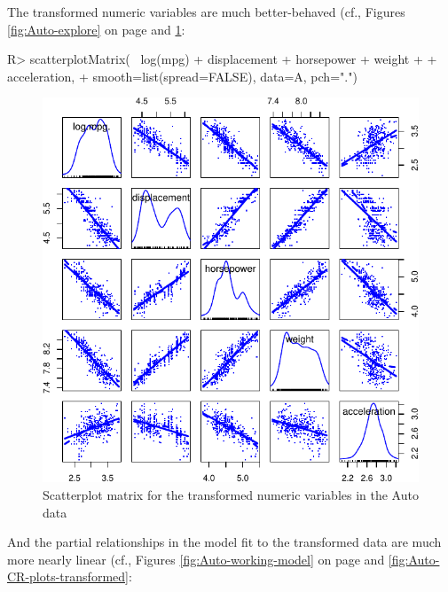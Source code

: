 \documentclass[
]{jss}
\begin{document}
The transformed numeric variables are much better-behaved (cf., Figures
\ref{fig:Auto-explore} on page \pageref{fig:Auto-explore} and
\ref{fig:Auto-transformed-scatterplot-matrix}:

\begin{CodeChunk}
\begin{CodeInput}
R> scatterplotMatrix(~ log(mpg) + displacement + horsepower + weight 
+                   + acceleration, 
+                   smooth=list(spread=FALSE), data=A, pch=".")
\end{CodeInput}
\begin{figure}

{\centering \includegraphics[width=0.6\linewidth]{JSS-article-reduced_files/figure-latex/Auto-transformed-scatterplot-matrix-1} 

}

\caption[Scatterplot matrix for the transformed numeric variables in the Auto data]{Scatterplot matrix for the transformed numeric variables in the Auto data}\label{fig:Auto-transformed-scatterplot-matrix}
\end{figure}
\end{CodeChunk}

And the partial relationships in the model fit to the transformed data
are much more nearly linear (cf., Figures \ref{fig:Auto-working-model}
on page \pageref{fig:Auto-working-model} and
\ref{fig:Auto-CR-plots-transformed}:
\end{document}
